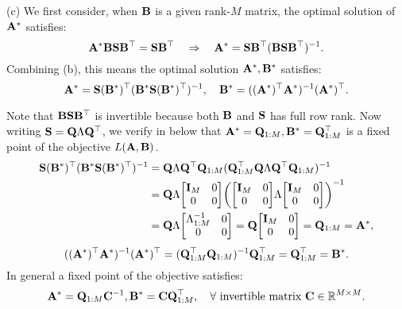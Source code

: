 (c) We first consider, when $\mathbf B$ is a given rank-$M$ matrix, the optimal solution of $\mathbf A^*$ satisfies:
$$ \mathbf A^* \mathbf B \mathbf{S} \mathbf B^\top = \mathbf{S} \mathbf B^\top \quad \Rightarrow \quad \mathbf A^* = \mathbf{S} \mathbf B^\top (\mathbf B \mathbf{S} \mathbf B^\top)^{-1}.$$
Combining (b), this means the optimal solution $\mathbf A^*, \mathbf B^*$ satisfies:
$$ \mathbf A^* = \mathbf{S} (\mathbf B^*)^\top (\mathbf B^* \mathbf{S} (\mathbf B^*)^\top)^{-1}, \quad \mathbf B^* = ((\mathbf A^*)^\top \mathbf A^*)^{-1} (\mathbf A^*)^\top.$$

Note that $\mathbf B \mathbf{S} \mathbf B^\top$ is invertible because both $\mathbf B$ and $\mathbf{S}$ has full row rank. Now writing $\mathbf{S} = \mathbf{Q} \Lambda \mathbf{Q}^\top$, we verify in below that $\mathbf A^* = \mathbf{Q}_{1:M}, \mathbf B^* = \mathbf{Q}_{1:M}^{\top}$ is a fixed point of the objective $L(\mathbf A, \mathbf B)$.
\begin{equation*}
\begin{aligned}
\BS (\BB^*)^\top (\BB^* \BS (\BB^*)^\top)^{-1} &= \BQ \Lambda \BQ^\top \BQ_{1:M} (\BQ_{1:M}^{\top} \BQ \Lambda \BQ^\top \BQ_{1:M})^{-1} \\
&= \BQ \Lambda \begin{bmatrix} \mathbf{I}_{M} & 0 \\ 0 & 0 \end{bmatrix} \left( \begin{bmatrix} \mathbf{I}_{M} & 0 \\ 0 & 0 \end{bmatrix} \Lambda \begin{bmatrix} \mathbf{I}_{M} & 0 \\ 0 & 0 \end{bmatrix} \right)^{-1} \\
&= \BQ \Lambda \begin{bmatrix} \Lambda_{1:M}^{-1} & 0 \\ 0 & 0 \end{bmatrix} = \BQ \begin{bmatrix} \mathbf{I}_{M} & 0 \\ 0 & 0 \end{bmatrix} = \BQ_{1:M} = \BA^*,
\end{aligned}
\end{equation*}
%
\begin{equation*}
((\mathbf A^*)^\top \mathbf A^*)^{-1} (\mathbf A^*)^\top = (\mathbf{Q}_{1:M}^\top \mathbf{Q}_{1:M})^{-1} \mathbf{Q}_{1:M}^\top = \mathbf{Q}_{1:M}^\top = \mathbf B^*.
\end{equation*}
In general a fixed point of the objective satisfies:
$$ \mathbf A^* = \mathbf{Q}_{1:M} \mathbf C^{-1}, \mathbf B^* = \mathbf C \mathbf{Q}_{1:M}^{\top}, \quad \forall \text{ invertible matrix } \mathbf C \in \mathbb{R}^{M \times M}.$$



